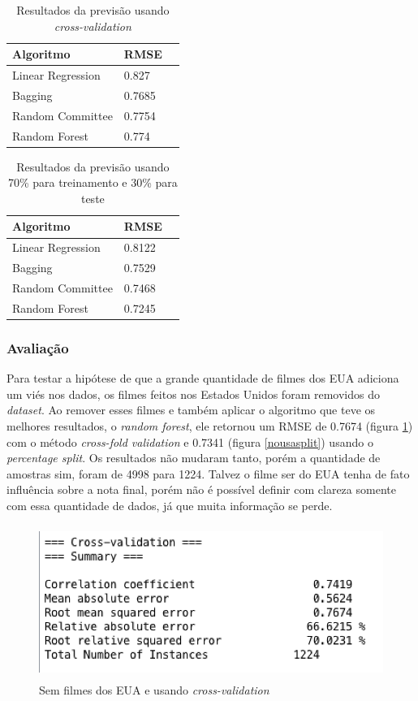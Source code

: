 \begin{longtable}{|l|l|l|}
\caption{Resultados da previsão usando \textit{cross-validation}}
\label{cvfull}
\\ \hline
\textbf{Algoritmo} & \textbf{RMSE}  \\ \hline
Linear Regression      & 0.827                    \\ \hline
Bagging                & 0.7685                   \\ \hline
Random Committee       & 0.7754                   \\ \hline
Random Forest          & 0.774                    \\ \hline
\end{longtable}


\begin{longtable}{|l|l|l|}
\caption{Resultados da previsão usando 70\% para treinamento e 30\% para teste}
\label{splitfull}
\\\hline
\textbf{Algoritmo} & \textbf{RMSE} \\ \hline
Linear Regression      & 0.8122                   \\ \hline
Bagging                & 0.7529                   \\ \hline
Random Committee       & 0.7468                   \\ \hline
Random Forest          & 0.7245                   \\ \hline
\end{longtable}


\subsubsection{Avaliação}
Para testar a hipótese de que a grande quantidade de filmes dos EUA adiciona um viés nos dados, os filmes feitos nos Estados Unidos foram removidos do \textit{dataset}. Ao remover esses filmes e também aplicar o algoritmo que teve os melhores resultados, o \textit{random forest}, ele retornou um RMSE de 0.7674 (figura \ref{nousacv}) com o método \textit{cross-fold validation} e 0.7341 (figura \ref{nousasplit}) usando o \textit{percentage split}. Os resultados não mudaram tanto, porém a quantidade de amostras sim, foram de 4998 para 1224. Talvez o filme ser do EUA tenha de fato influência sobre a nota final, porém não é possível definir com clareza somente com essa quantidade de dados, já que muita informação se perde.

\begin{figure}[H]
\centering
\includegraphics[height=5cm]{imagens/sem_usa_cv.png}
\caption{Sem filmes dos EUA e usando \textit{cross-validation}}
\label{nousacv}
\end{figure}


